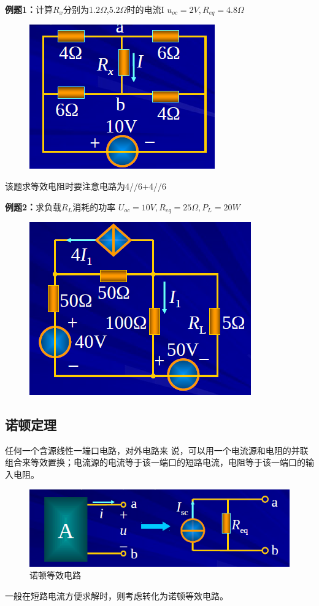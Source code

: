 \documentclass[11pt,a4paper,oneside]{book}
\begin{document}
\noindent\textbf{例题1：}计算$R_x$分别为1.2$\Omega$,5.2$\Omega$时的电流I \quad
$u_{oc}=2V,R_{eq}=4.8\Omega$
\begin{figure}[H]
	\centering
	\includegraphics[width=0.5\linewidth]{screenshot069}
	\caption{}
	\label{fig:screenshot069}
\end{figure}
该题求等效电阻时要注意电路为4//6+4//6

\noindent\textbf{例题2：}求负载$R_L$消耗的功率 \quad $U_{oc}=10V,R_{eq}=25\Omega,P_L=20W$
\begin{figure}[H]
	\centering
	\includegraphics[width=0.5\linewidth]{screenshot070}
	\caption{}
	\label{fig:screenshot070}
\end{figure}

\subsection{诺顿定理}
任何一个含源线性一端口电路，对外电路来
说，可以用一个电流源和电阻的并联组合来等效置换；电流源的电流等于该一端口的短路电流，电阻等于该一端口的输入电阻。
\begin{figure}[H]
	\centering
	\includegraphics[width=0.5\linewidth]{screenshot071}
	\caption{诺顿等效电路}
	\label{fig:screenshot071}
\end{figure}
一般在短路电流方便求解时，则考虑转化为诺顿等效电路。
\end{document}
